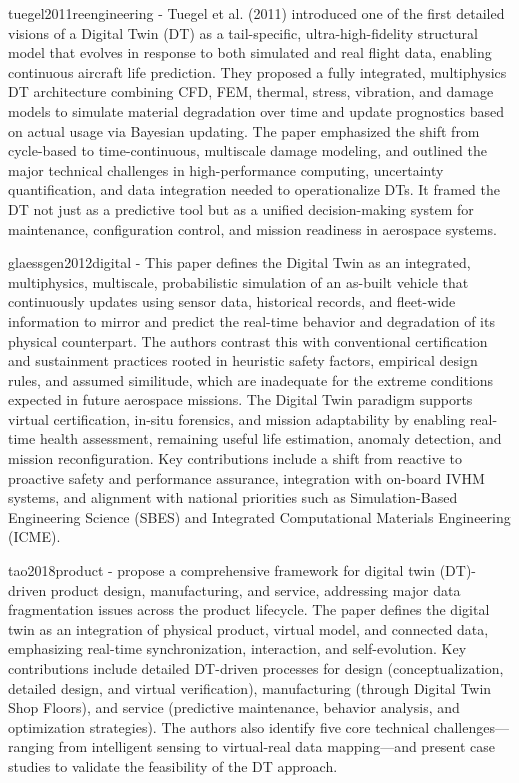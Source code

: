 
tuegel2011reengineering - Tuegel et al. (2011) introduced one of the first detailed visions of a Digital Twin (DT) as a tail-specific, ultra-high-fidelity structural model that evolves in response to both simulated and real flight data, enabling continuous aircraft life prediction. They proposed a fully integrated, multiphysics DT architecture combining CFD, FEM, thermal, stress, vibration, and damage models to simulate material degradation over time and update prognostics based on actual usage via Bayesian updating. The paper emphasized the shift from cycle-based to time-continuous, multiscale damage modeling, and outlined the major technical challenges in high-performance computing, uncertainty quantification, and data integration needed to operationalize DTs. It framed the DT not just as a predictive tool but as a unified decision-making system for maintenance, configuration control, and mission readiness in aerospace systems.

glaessgen2012digital - This paper defines the Digital Twin as an integrated, multiphysics, multiscale, probabilistic simulation of an as-built vehicle that continuously updates using sensor data, historical records, and fleet-wide information to mirror and predict the real-time behavior and degradation of its physical counterpart. The authors contrast this with conventional certification and sustainment practices rooted in heuristic safety factors, empirical design rules, and assumed similitude, which are inadequate for the extreme conditions expected in future aerospace missions. The Digital Twin paradigm supports virtual certification, in-situ forensics, and mission adaptability by enabling real-time health assessment, remaining useful life estimation, anomaly detection, and mission reconfiguration. Key contributions include a shift from reactive to proactive safety and performance assurance, integration with on-board IVHM systems, and alignment with national priorities such as Simulation-Based Engineering Science (SBES) and Integrated Computational Materials Engineering (ICME).

tao2018product - propose a comprehensive framework for digital twin (DT)-driven product design, manufacturing, and service, addressing major data fragmentation issues across the product lifecycle. The paper defines the digital twin as an integration of physical product, virtual model, and connected data, emphasizing real-time synchronization, interaction, and self-evolution. Key contributions include detailed DT-driven processes for design (conceptualization, detailed design, and virtual verification), manufacturing (through Digital Twin Shop Floors), and service (predictive maintenance, behavior analysis, and optimization strategies). The authors also identify five core technical challenges—ranging from intelligent sensing to virtual-real data mapping—and present case studies to validate the feasibility of the DT approach.

